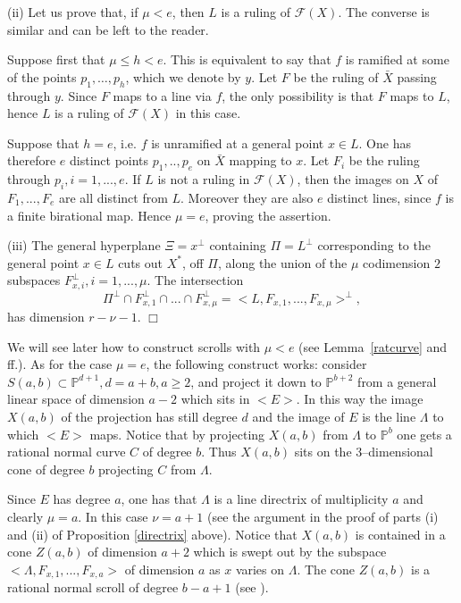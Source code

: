 \documentclass[11pt]{article}   %
\theoremstyle{definition}
\numberwithin{Theorem}{section} \numberwithin{equation}{section}
\def\QED{\hfill$\Box$}
\def\qed{\QED}
\newcommand{\F}{{\mathcal F}}
\newcommand{\p}{{\mathbb P}}
\begin{document}
{(ii)  Let us prove that, if $\mu<e$, then $L$ is a ruling of $\F(X)$.
The converse is similar and can be left to the reader.

Suppose first that $\mu\leq h<e$. This is equivalent to say that $f$ is
ramified at some of the points $p_1,\dots, p_h$, which we denote
by $y$. Let $F$ be the ruling of $\bar X$ passing through $y$.
Since $F$ maps to a line via $f$, the only possibility is that $F$
maps to $L$, hence $L$ is a ruling of $\F(X)$ in this case.

Suppose that $h=e$, i.e. $f$ is unramified at a general point $x\in L$. One
has therefore $e$ distinct points $p_1,..,p_e$ on $\bar X$ mapping
to $x$. Let $F_i$ be the ruling through $p_i, i=1,...,e$. If $L$ is
not a ruling in $\F(X)$, then the images on $X$ of $F_1,...,F_e$
are all distinct from $L$. Moreover they are also $e$ distinct lines,
since $f$ is a finite birational map. Hence $\mu=e$, proving the assertion.

(iii) The general hyperplane $\Xi=x^ \perp$ containing $\Pi=L^ \perp$
corresponding to the general point $x\in L$ cuts out $X^*$, off
$\Pi$, along the union of the $\mu$ codimension $2$ subspaces
$F_{x,i}^ \perp, i=1,...,\mu$. The intersection
$$\Pi^  \perp\cap F_{x,1}^ \perp\cap...\cap
F_{x,\mu}^ \perp=<L, F_{x,1},...,F_{x,\mu}>^ \perp,$$
has dimension $r-\nu-1$. \qed

\medskip

We will see  later how to construct scrolls with $\mu<e$ (see
Lemma~\ref{ratcurve} and ff.). As for the case $\mu=e$, the
following construct works: consider $S(a,b)\subset \p^ {d+1}, d=a+b,
a\geq 2$, and project it down to $\p^ {b+2}$ from a general linear
space of dimension $a-2$ which sits in $<E>$. In this way the image
$X(a,b)$ of the projection has still degree $d$ and the image of $E$
is the line $\Lambda$ to which $<E>$ maps. Notice that by projecting
$X(a,b)$ from $\Lambda$ to $\p^ b$ one gets a rational
normal curve $C$ of degree $b$. Thus
$X(a,b)$ sits {on} the $3$--dimensional cone of degree $b$
projecting $C$ from $\Lambda$.

Since $E$ has degree $a$, one has that $\Lambda$ is a line directrix
of multiplicity $a$ and clearly $\mu=a$. In this case $\nu=a+1$
(see the argument in the proof of parts (i) and (ii) of  Proposition \ref{directrix} above).
Notice that $X(a,b)$ is contained in a cone $Z(a,b)$ of dimension $a+2$
which is swept out by the subspace $<\Lambda, F_{x,1},...,F_{x,a}>$
of dimension $a$  as $x$ varies on $\Lambda$. The cone $Z(a,b)$ is a
rational normal scroll of degree $b-a+1$ (see \cite {EH}).


}
\end{document}
